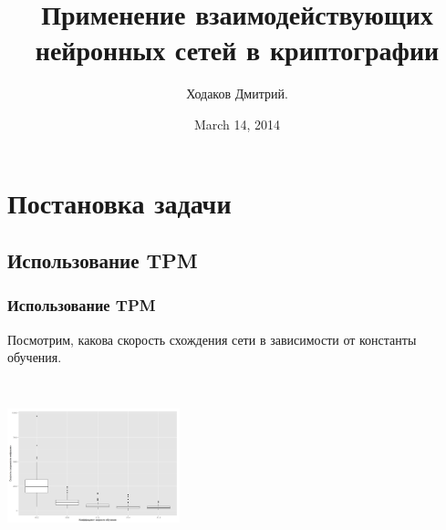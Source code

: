 \documentclass{beamer}
\title{Применение взаимодействующих нейронных сетей в криптографии}
\author{Ходаков Дмитрий.}
\date{March 14, 2014} %
\begin{document}
\frame{\titlepage}
\frame{\tableofcontents}
\section{Постановка задачи}
\subsection{Использование TPM}
\begin{frame}
\frametitle{Использование TPM}
Посмотрим, какова скорость схождения сети в зависимости от константы обучения.

\begin{center}
\includegraphics[width=5cm, height=5cm]{../../plots/eta_vs_speed.png}

\end{center}

\end{frame}
\end{document}
